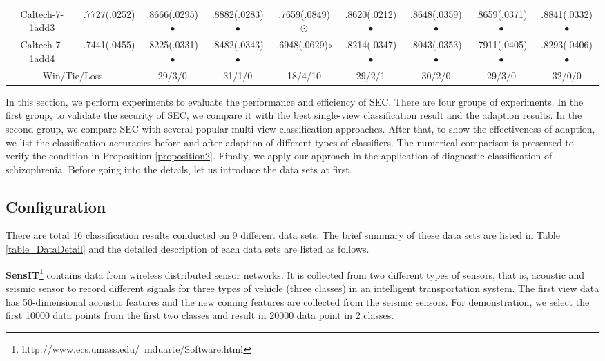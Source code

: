 \documentclass[10pt,journal,compsoc]{IEEEtran}
\begin{document}
\begin{table*}[!t]
{\begin{tabular}{c|| c c c c c c c c }
Caltech-7-1add3 & .7727(.0252)& .8666(.0295)$\bullet$ & .8882(.0283)$\bullet$ & .7659(.0849){\tiny $\odot$} & .8620(.0212)$\bullet$ & .8648(.0359)$\bullet$ & .8659(.0371)$\bullet$ & .8841(.0332)$\bullet$ \\
Caltech-7-1add4 & .7441(.0455)& .8225(.0331)$\bullet$ & .8482(.0343)$\bullet$ & .6948(.0629)$\circ$ & .8214(.0347)$\bullet$ & .8043(.0353)$\bullet$ & .7911(.0405)$\bullet$ & .8293(.0406)$\bullet$ \\
\hline
\multicolumn{2}{c}{Win/Tie/Loss}& 29/3/0 & 31/1/0 & 18/4/10 & 29/2/1 & 30/2/0 & 29/3/0 & 32/0/0  \\
\hline
\end{tabular}}
\vskip -0.1in
\end{table*}

In this section, we perform experiments to evaluate the performance and efficiency of SEC. There are four groups of experiments. In the first group, to validate the security of SEC, we compare it with the best single-view classification result and the adaption results. In the second group, we compare SEC with several popular multi-view classification approaches. After that, to show the effectiveness of adaption, we list the classification accuracies before and after adaption of different types of classifiers. The numerical comparison is presented to verify the condition in Proposition \ref{proposition2}. Finally, we apply our approach in the application of diagnostic classification of schizophrenia. Before going into the details, let us introduce the data sets at first.

\subsection{Configuration}

There are total 16 classification results conducted on 9 different data sets. The brief summary of these data sets are listed in Table \ref{table_DataDetail} and the detailed description of each data sets are listed as follows.

\textbf{SensIT}\footnote{ http://www.ecs.umass.edu/~mduarte/Software.html} contains data from wireless distributed sensor networks. It is collected from two different types of sensors, that is, acoustic and seismic sensor to record different signals for three types of vehicle (three classes) in an intelligent transportation system. The first view data has 50-dimensional acoustic features and the new coming features are collected from the seismic sensors. For demonstration, we select the first 10000 data points from the first two classes and result in 20000 data point in 2 classes.
\end{document}
